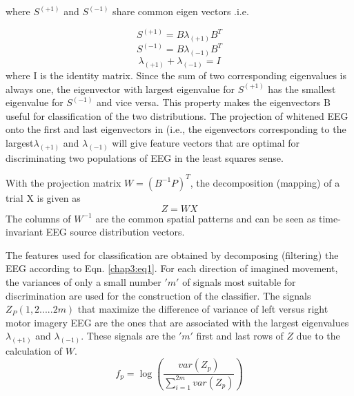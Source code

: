   where $S^{\left(+1\right)}$ and $S^{\left(-1\right)}$ share common eigen vectors .i.e.
  
  \begin{equation}
  S^{\left( +1\right)} = B \lambda_{\left( +1\right)} B^{T}
  \end{equation}
  \begin{equation}
  S^{\left( -1\right)} = B \lambda_{\left( -1\right)} B^{T}
  \end{equation}
  \begin{equation}
  \lambda_{\left(+1\right)} +  \lambda_{\left(-1\right)} = I
  \end{equation}
        where I is the identity matrix. Since the sum of two corresponding eigenvalues is always one, the eigenvector with largest eigenvalue for $S^{\left( +1\right)}$  has the smallest eigenvalue for $S^{\left( -1\right)}$ and vice versa. This property makes the eigenvectors B useful for classification of the two distributions. The projection of whitened EEG onto the first and last eigenvectors in (i.e., the eigenvectors corresponding to the largest$\lambda_{\left(+1\right)}$ and  $\lambda_{\left(-1\right)}$ will give feature vectors that are optimal for discriminating two populations of EEG in the least squares sense.
        
With the projection matrix $W=\left(B^{-1} P\right)^T$, the decomposition (mapping) of a trial X is given as 
        \begin{equation} \label{chap3:eq1}
        Z=WX
        \end{equation}
                                                                                   The columns of $W^{-1}$ are the common spatial patterns and can be seen as time-invariant EEG source distribution vectors.
             
    The features used for classification are obtained by decomposing (filtering) the EEG according to Eqn. \ref{chap3:eq1}. For each direction of imagined movement, the variances of only a small number $'m'$ of signals most suitable for discrimination are used for the construction of the classifier. The signals $Z_P\left(1, 2.....2m\right)$ that maximize the difference of variance of left versus right motor imagery EEG are the ones that are associated with the largest eigenvalues $\lambda_{\left(+1\right)}$ and  $\lambda_{\left(-1\right)}$. These signals are the $'m'$ first and last rows of $Z$ due to the calculation of $W$.
    \begin{equation} \label{chap3:eq1}
    f_p=\log\left(\frac{var\left(Z_p\right)}{\sum_{i=1}^{2m} var\left(Z_p\right)   }\right)
      \end{equation}
       
